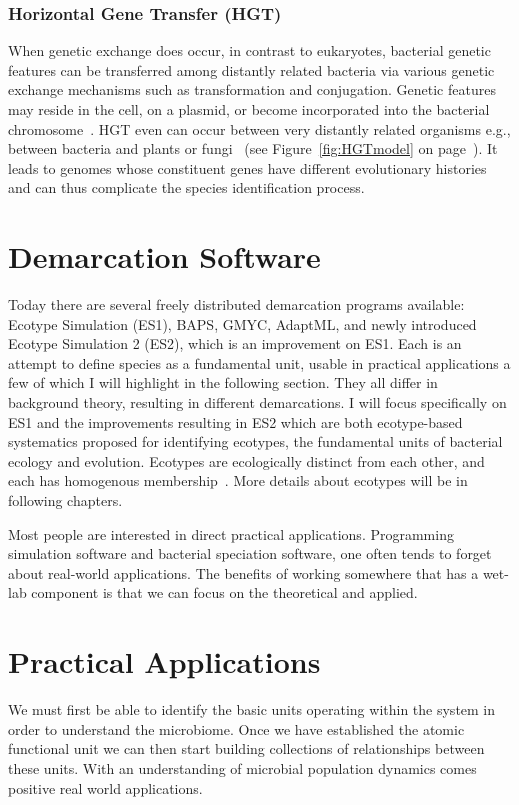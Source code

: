 \subsubsection*{Horizontal Gene Transfer (HGT)}
When genetic exchange does occur, in contrast to eukaryotes, bacterial genetic features can be transferred among distantly related bacteria via various genetic exchange mechanisms such as transformation and conjugation.
Genetic features may reside in the cell, on a plasmid, or become incorporated into the bacterial chromosome~\cite{staley1997biodiversity}.
HGT even can occur between very distantly related organisms e.g., between bacteria and plants or fungi~\cite{gogarten2002prokaryotic} (see Figure~\ref{fig:HGTmodel} on page~\pageref{fig:HGTmodel}).
It leads to genomes whose constituent genes have different evolutionary histories~\cite{gogarten2002prokaryotic} and can thus complicate the species identification process.


\section{Demarcation Software}
Today there are several freely distributed demarcation programs available: Ecotype Simulation (ES1), BAPS, GMYC, AdaptML, and newly introduced Ecotype Simulation 2 (ES2), which is an improvement on ES1.
Each is an attempt to define species as a fundamental unit, usable in practical applications a few of which I will highlight in the following section.
They all differ in background theory, resulting in different demarcations.
I will focus specifically on ES1 and the improvements resulting in ES2 which are both ecotype-based systematics proposed for identifying ecotypes, the fundamental units of bacterial ecology and evolution.
Ecotypes are ecologically distinct from each other, and each has homogenous membership~\cite{cohan2007systematics}.
More details about ecotypes will be in following chapters.

Most people are interested in direct practical applications.
Programming simulation software and bacterial speciation software, one often tends to forget about real-world applications.
The benefits of working somewhere that has a wet-lab component is that we can focus on the theoretical and applied.

\section{Practical Applications}
We must first be able to identify the basic units operating within the system in order to understand the microbiome.
Once we have established the atomic functional unit we can then start building collections of relationships between these units.
With an understanding of microbial population dynamics comes positive real world applications.

